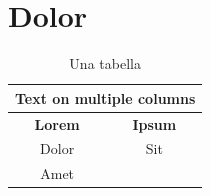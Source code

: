     \lipsum[4]

\section{Dolor}\label{sec:dolor}

    \lipsum[3]

    \begin{table}[h]
        \centering
        \begin{center}
            \begin{tabular}{|c||c|}
                \hline
                \multicolumn{2}{|c|}{Text on multiple columns} \\
                \hline
                \textbf{Lorem} & \textbf{Ipsum} \\
                \hline
                \hline
                Dolor & Sit \\
                \hline
                Amet &  \\
                \hline
            \end{tabular}
        \end{center}
        \caption{Una tabella}
        \label{tab:example}
    \end{table}

    \lipsum[4-5]
